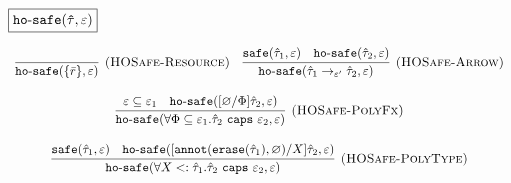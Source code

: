 \documentclass{llncs}
\newcommand{\keywadj}[1]{\mathtt{#1}}
\newcommand{\keyw}[1]{\keywadj{#1}~}
\newcommand{\kw}[1]{\keyw{ #1 }}
\newcommand{\kwa}[1]{\keywadj{ #1 }}
\newcommand{\hyphen}{\hbox{-}}
\newcommand{\safe}[2]{ \kwa{safe}(#1, #2) }
\newcommand{\hosafe}[2]{ \kwa{ho \hyphen safe}(#1, #2) }
\newcommand{\annot}[2]{
	\keywadj{annot}(#1, #2)
}
\newcommand{\erase}[1]{
	\keywadj{erase}(#1)
}
\newcommand{\polycap}[3]{
	\forall #1. #2~ \kw{caps} #3
}
\newcommand{\ispoly}[1]{
	\kwa{is \hyphen poly}(#1)
}
\begin{document}
\noindent
$\fbox{$\kwa{ho \hyphen safe(\hat \tau, \varepsilon)}$}$

\[
\begin{array}{c}

\infer[\textsc{(HOSafe-Resource)}]
	{ \kwa{ho \hyphen safe}( \{ \bar r \}, \varepsilon)} 
	{}
	~~~
\infer[\textsc{(HOSafe-Arrow)}]
	{ \kwa{ho \hyphen safe}( \hat \tau_1 \rightarrow_{\varepsilon'} \hat \tau_2, \varepsilon ) }
	{ \kwa{safe}(\hat \tau_1, \varepsilon)  & \kwa{ho \hyphen safe}(\hat \tau_2, \varepsilon) }\\[3ex]

\infer[\textsc{(HOSafe-PolyFx)}]
	{\hosafe{\forall \Phi \subseteq \varepsilon_1. \hat \tau_2~\kw{caps} \varepsilon_2}{\varepsilon}}
	{\varepsilon \subseteq \varepsilon_1 & \hosafe{[\varnothing/\Phi]\hat \tau_2}{\varepsilon}}\\[3ex]

\infer[\textsc{(HOSafe-PolyType)}]
	{\hosafe{\forall X <: \hat \tau_1. \hat \tau_2~\kw{caps} \varepsilon_2}{\varepsilon}}
	{\safe{\hat \tau_1}{\varepsilon} & \hosafe{[\annot{\erase{\hat \tau_1}}{\varnothing}/X]\hat \tau_2}{\varepsilon}}

\end{array}
\]









\fbox{$\hat \Gamma \vdash \hat \tau <: \hat \tau$}
\end{document}
